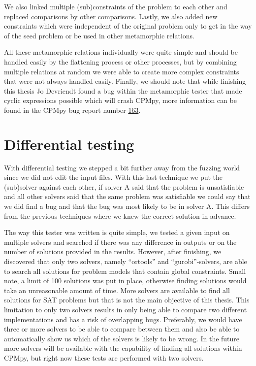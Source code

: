 We also linked multiple (sub)constraints of the problem to each other and replaced comparisons by other comparisons. Lastly, we also added new constraints which were independent of the original problem only to get in the way of the seed problem or be used in other metamorphic relations.

All these metamorphic relations individually were quite simple and should be handled easily by the flattening process or other processes, but by combining multiple relations at random we were able to create more complex constraints that were not always handled easily. Finally, we should note that while finishing this thesis Jo Devriendt found a bug within the metamorphic tester that made cyclic expressions possible which will crash CPMpy, more information can be found in the CPMpy bug report number \href{https://github.com/CPMpy/cpmpy/issues/163}{163}.

\section{Differential testing}
\label{impl:diff}
With differential testing we stepped a bit further away from the fuzzing world since we did not edit the input files.
With this last technique we put the (sub)solver against each other, if solver A said that the problem is unsatisfiable and all other solvers said that the same problem was satisfiable we could say that we did find a bug and that the bug was most likely to be in solver A. This differs from the previous techniques where we knew the correct solution in advance.


The way this tester was written is quite simple, we tested a given input on multiple solvers and searched if there was any difference in outputs or on the number of solutions provided in the results.
However, after finishing, we discovered that only two solvers, namely “ortools” and “gurobi”-solvers, are able to search all solutions for problem models that contain global constraints. Small note, a limit of 100 solutions was put in place, otherwise finding solutions would take an unreasonable amount of time. More solvers are available to find all solutions for SAT problems but that is not the main objective of this thesis. This limitation to only two solvers results in only being able to compare two different implementations and has a risk of overlapping bugs. Preferably, we would have three or more solvers to be able to compare between them and also be able to automatically show us which of the solvers is likely to be wrong. In the future more solvers will be available with the capability of finding all solutions within CPMpy, but right now these tests are performed with two solvers. 

